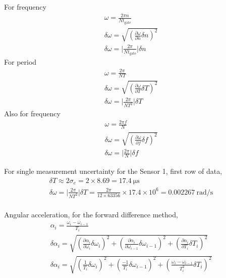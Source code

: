 \section{}
For frequency
\begin{gather*}
    \omega = \frac{2 \pi n}{N t_{\text{gate}}} \\
    \delta \omega = \sqrt{\left(\frac{\partial \omega}{\partial n} \delta n\right)^2} \\
    \delta \omega = \bigg| \frac{2 \pi}{N t_{\text{gate}}} \bigg| \delta n 
\end{gather*}
For period
\begin{gather*}
    \omega = \frac{2 \pi}{N T} \\
    \delta \omega = \sqrt{\left(\frac{\partial \omega}{\partial T} \delta T\right)^2} \\
    \delta \omega = \bigg| \frac{2 \pi}{N T^2} \bigg| \delta T 
\end{gather*}
Also for frequency
\begin{gather*}
    \omega = \frac{2\pi f}{N} \\
    \delta \omega = \sqrt{\left(\frac{\partial \omega}{\partial f} \delta f\right)^2} \\
    \delta \omega = \bigg| \frac{2 \pi}{N} \bigg| \delta f
\end{gather*}

For single measurement uncertainty for the Sensor 1, first row of data,
\begin{gather*}
    \delta T \approx 2 \sigma_{e} = 2\times 8.69 = \qty{17.4}{\micro\second} \\
    \delta \omega = \bigg| \frac{2 \pi}{N T^2} \bigg| \delta T  = \frac{2 \pi}{12 \times 63356}\times 17.4 \times 10^{6} =  \qty{0.002267}{\radian\per\second} \\
\end{gather*}

Angular acceleration, for the forward difference method,
\begin{gather*}
    \alpha_i = \frac{\omega_i - \omega_{i-1}}{T_i} \\
    \delta \alpha_i = \sqrt{\left(\frac{\partial \alpha_i}{\partial \omega_i} \delta \omega_i\right)^2 
    + \left(\frac{\partial \alpha_i}{\partial \omega_{i-1}} \delta \omega_{i-1}\right)^2 
    + \left(\frac{\partial \alpha_i}{\partial T_i} \delta T_i\right)^2} \\
    \delta \alpha_i = \sqrt{\left(\frac{1}{T_i} \delta \omega_i\right)^2
    + \left(\frac{-1}{T_i} \delta \omega_{i-1}\right)^2
    + \left(\frac{\omega_i - \omega_{i-1}}{T_i^2} \delta T_i\right)^2} 
\end{gather*}

